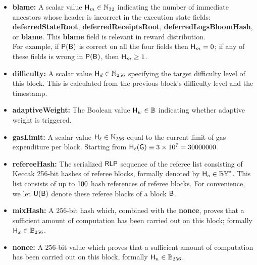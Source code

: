 \begin{itemize}[nosep]
	\item {\bf blame:} A scalar value $\textsf{H}_{m}\in\mathbb{N}_{32}$ indicating the number of immediate ancestors whose header is incorrect in the execution state fields: {\bf deferredStateRoot}, {\bf deferredReceiptsRoot}, {\bf deferredLogsBloomHash}, or {\bf blame}. 
	This {\bf blame} field is relevant in reward distribution.\\
	For example, if $\mathsf{P}{\left({\textsf{B}} \right)}$ is correct on all the four fields then $\textsf{H}_{m}=0$; if any of these fields is wrong in $\mathsf{P}{\left({\textsf{B}} \right)}$, then $\textsf{H}_{m} \ge 1$.


	\item {\bf difficulty:} A scalar value $\textsf{H}_d\in\mathbb{N}_{256}$ specifying the target difficulty level of this block. This is calculated from the previous block's difficulty level and the timestamp.


	\item {\bf adaptiveWeight:} The Boolean value $\textsf{H}_w\in\mathbb{B}$ indicating whether adaptive weight is triggered.



	\item {\bf gasLimit:} A scalar value $\textsf{H}_{\ell}\in\mathbb{N}_{256}$ equal to the current limit of gas expenditure per block. 
	Starting from $\textsf{H}_{\ell}(\textsf{G})\equiv 3\times 10^7=30000000$.

	\item {\bf refereeHash:} The serialized $\mathsf{RLP}$ sequence of the referee list consisting of  Keccak 256-bit hashes of referee blocks, formally denoted by $\textsf{H}_o \in\mathbb{BY}^*$. 
	This list consists of up to $100$ hash references of referee blocks.
	For convenience, we let $\textsf{U}(\textsf{B})$ denote these referee blocks of a block $\textsf{B}$.
	



	\item {\bf mixHash:} A $256$-bit hash which, combined with the {\bf nonce}, proves that a sufficient amount of computation has been carried out on this block; formally $\textsf{H}_x\in\mathbb{B}_{256}$.

	\item {\bf nonce:} A $256$-bit value which
	proves that a sufficient amount of computation has been carried out on this block, formally $\textsf{H}_n\in\mathbb{B}_{256}$.


\end{itemize}
	
